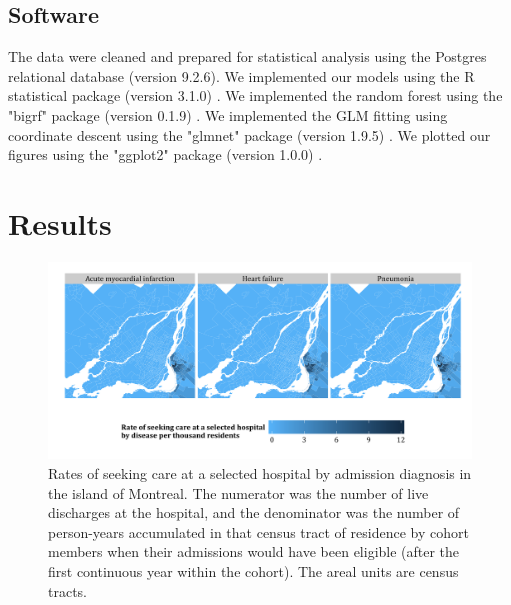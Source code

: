 \documentclass[]{article}\usepackage[]{graphicx}\usepackage[]{color}
\begin{document}
\subsection{Software}
The data were cleaned and prepared for statistical analysis using the Postgres relational database (version 9.2.6). We implemented our models using the R statistical package (version 3.1.0) \supercite{team_r:_2014}. We implemented the random forest using the "bigrf" package (version 0.1.9) \supercite{lim_bigrf:_2014}. We implemented the GLM fitting using coordinate descent using the "glmnet" package (version 1.9.5) \supercite{friedman_regularization_2010}. We plotted our figures using the "ggplot2" package (version 1.0.0) \supercite{wickham_ggplot2:_2009}.


\section{Results}
\begin{figure}[H]
    \includegraphics{../figures/hosp_choro.png}
    \caption[Rates of seeking care at a selected hospital by admission diagnosis.]
{Rates of seeking care at a selected hospital by admission diagnosis in the island of Montreal. The numerator was the number of live discharges at the hospital, and the denominator was the number of person-years accumulated in that census tract of residence by cohort members when their admissions would have been eligible (after the first continuous year within the cohort). The areal units are census tracts.}
    \label{fig:hosp_choro}
\end{figure}
\end{document}
